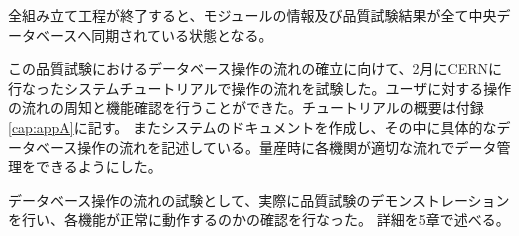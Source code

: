 全組み立て工程が終了すると、モジュールの情報及び品質試験結果が全て中央データベースへ同期されている状態となる。


この品質試験におけるデータベース操作の流れの確立に向けて、2月にCERNに行なったシステムチュートリアルで操作の流れを試験した。ユーザに対する操作の流れの周知と機能確認を行うことができた。チュートリアルの概要は付録\ref{cap:appA}に記す。
またシステムのドキュメント\cite{4-7}を作成し、その中に具体的なデータベース操作の流れを記述している。量産時に各機関が適切な流れでデータ管理をできるようにした。


データベース操作の流れの試験として、実際に品質試験のデモンストレーションを行い、各機能が正常に動作するのかの確認を行なった。
詳細を5章で述べる。

